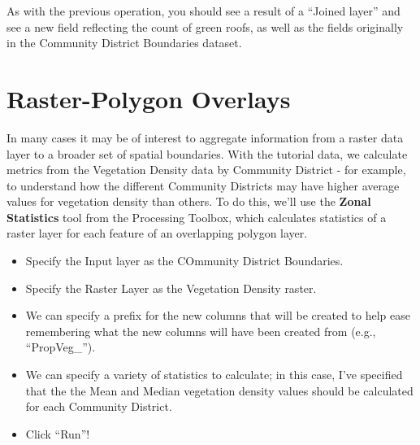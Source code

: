 \documentclass[
  letterpaper,
  DIV=11,
  numbers=noendperiod]{scrreprt}
\providecommand{\tightlist}{%
  \setlength{\itemsep}{0pt}\setlength{\parskip}{0pt}}\usepackage{longtable,booktabs,array}
\begin{document}
As with the previous operation, you should see a result of a ``Joined
layer'' and see a new field reflecting the count of green roofs, as well
as the fields originally in the Community District Boundaries dataset.

\hypertarget{raster-polygon-overlays}{%
\section{Raster-Polygon Overlays}\label{raster-polygon-overlays}}

In many cases it may be of interest to aggregate information from a
raster data layer to a broader set of spatial boundaries. With the
tutorial data, we calculate metrics from the Vegetation Density data by
Community District - for example, to understand how the different
Community Districts may have higher average values for vegetation
density than others. To do this, we'll use the \textbf{Zonal Statistics}
tool from the Processing Toolbox, which calculates statistics of a
raster layer for each feature of an overlapping polygon layer.

\begin{itemize}
\tightlist
\item
  Specify the Input layer as the COmmunity District Boundaries.
\item
  Specify the Raster Layer as the Vegetation Density raster.
\item
  We can specify a prefix for the new columns that will be created to
  help ease remembering what the new columns will have been created from
  (e.g., ``PropVeg\_'').
\item
  We can specify a variety of statistics to calculate; in this case,
  I've specified that the the Mean and Median vegetation density values
  should be calculated for each Community District.
\item
  Click ``Run''!
\end{itemize}
\end{document}

